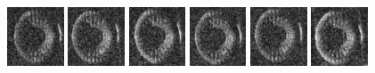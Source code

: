 \begin{figure}
    \includegraphics[width=0.15\textwidth]{chapters/images/dataset/all-class-images/tire/tire-230.jpg}
    \includegraphics[width=0.15\textwidth]{chapters/images/dataset/all-class-images/tire/tire-313.jpg}
    \includegraphics[width=0.15\textwidth]{chapters/images/dataset/all-class-images/tire/tire-222.jpg}
    \includegraphics[width=0.15\textwidth]{chapters/images/dataset/all-class-images/tire/tire-226.jpg}
    \includegraphics[width=0.15\textwidth]{chapters/images/dataset/all-class-images/tire/tire-311.jpg}
    \includegraphics[width=0.15\textwidth]{chapters/images/dataset/all-class-images/tire/tire-275.jpg}
    

\end{figure}
